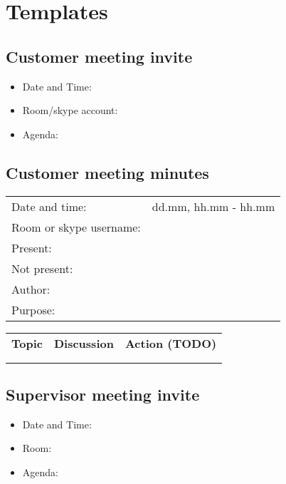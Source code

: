 \chapter{Templates}

\section{Customer meeting invite}

\begin{itemize}
	\item Date and Time:
	\item Room/skype account:
	\item Agenda:
\end{itemize}

\section{Customer meeting minutes}

\begin{tabular}{| p{3cm} | p{9cm} |}
	\hline
	\rowcolor{gray}
	\multicolumn{2}{|c|}{\Large \bf Meeting Minutes - Customer Meeting} \\ \hline
	Date and time: & dd.mm,  hh.mm - hh.mm \\ \hline
	Room or skype username: &  \\ \hline
	Present: &  \\ \hline
	Not present: &  \\ \hline
	Author: &  \\ \hline
	Purpose: &  \\ \hline
\end{tabular}

\begin{tabular}{| p{} | p{} | p{} |}
	\hline
	\rowcolor{gray}
	\multicolumn{3}{|c|}{\Large \bf Agenda} \\ \hline
	{\bf Topic} & {\bf Discussion} & {\bf Action (TODO)} \\ \hline
	& & \\ \hline
	& & \\ \hline
\end{tabular}

\section{Supervisor meeting invite}

\begin{itemize}
	\item Date and Time:
	\item Room:
	\item Agenda:
\end{itemize}

